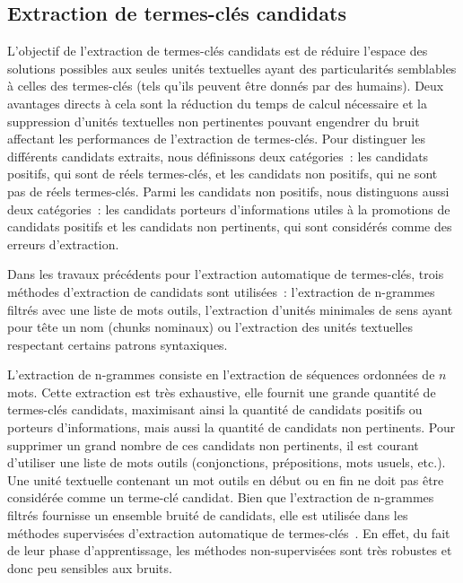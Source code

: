   \subsection{Extraction de termes-clés candidats}
  \label{subsec:extraction_de_termes_cles_candidats}
    L'objectif de l'extraction de termes-clés candidats est de réduire l'espace
    des solutions possibles aux seules unités textuelles ayant des
    particularités semblables à celles des termes-clés (tels qu'ils peuvent être
    donnés par des humains). Deux avantages directs à cela sont la réduction du
    temps de calcul nécessaire et la suppression d'unités textuelles non
    pertinentes pouvant engendrer du bruit affectant les performances de
    l'extraction de termes-clés. Pour distinguer les différents candidats
    extraits, nous définissons deux catégories~: les candidats positifs, qui
    sont de réels termes-clés, et les candidats non positifs, qui ne sont pas de
    réels termes-clés. Parmi les candidats non positifs, nous distinguons aussi
    deux catégories~: les candidats porteurs d'informations utiles à la
    promotions de candidats positifs et les candidats non pertinents, qui sont
    considérés comme des erreurs d'extraction.

    Dans les travaux précédents pour l'extraction automatique de termes-clés,
    trois méthodes d'extraction de candidats sont utilisées~: l'extraction de
    n-grammes filtrés avec une liste de mots outils, l'extraction d'unités
    minimales de sens ayant pour tête un nom (chunks nominaux) ou l'extraction
    des unités textuelles respectant certains patrons syntaxiques.

    L'extraction de n-grammes consiste en l'extraction de séquences ordonnées de
    $n$ mots. Cette extraction est très exhaustive, elle fournit une grande
    quantité de termes-clés candidats, maximisant ainsi la quantité de candidats
    positifs ou porteurs d'informations, mais aussi la quantité de candidats non
    pertinents. Pour supprimer un grand nombre de ces candidats non pertinents,
    il est courant d'utiliser une liste de mots outils (conjonctions,
    prépositions, mots usuels, etc.). Une unité textuelle contenant un mot
    outils en début ou en fin ne doit pas être considérée comme un terme-clé
    candidat. Bien que l'extraction de n-grammes filtrés fournisse un ensemble
    bruité de candidats, elle est utilisée dans les méthodes supervisées
    d'extraction automatique de
    termes-clés~\cite{witten1999kea,turney1999learningalgorithms,hulth2003keywordextraction}.
    En effet, du fait de leur phase d'apprentissage, les méthodes
    non-supervisées sont très robustes et donc peu sensibles aux bruits.

